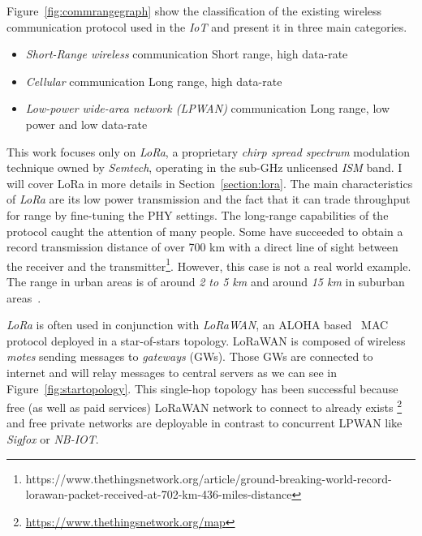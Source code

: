 Figure~\ref{fig:commrangegraph} show the classification
of the existing wireless communication protocol used in the \emph{IoT} and
present it in three main categories.

\begin{itemize}
    \item \emph{Short-Range wireless} communication Short range, high data-rate
    \item \emph{Cellular} communication Long range, high data-rate
    \item \emph{Low-power wide-area network (LPWAN)} communication Long range, low power and low data-rate
\end{itemize}



This work focuses only on \emph{LoRa}, a proprietary \emph{chirp spread spectrum}
modulation technique owned by \emph{Semtech}, operating in the sub-GHz
unlicensed \emph{ISM} band. I will cover LoRa in more details in 
Section~\ref{section:lora}.
The main characteristics of \emph{LoRa} are its low power transmission and the
fact that it can trade throughput for range by fine-tuning the PHY settings.
The long-range capabilities of the protocol caught the attention of
many people. 
Some have succeeded to obtain a record transmission distance of over 700 km with
a direct line of sight between the receiver and the
transmitter\footnote{https://www.thethingsnetwork.org/article/ground-breaking-world-record-lorawan-packet-received-at-702-km-436-miles-distance}.
However, this case is not a real world example. The range in urban areas is of
around \emph{2 to 5 km} and around \emph{15 km} in suburban
areas~\cite{8030482}.

\emph{LoRa} is often used in conjunction with \emph{LoRaWAN}, an ALOHA 
based~\cite{loraalliance:lorawanspecification} MAC protocol deployed in a star-of-stars 
topology.
LoRaWAN is composed of wireless \emph{motes} sending messages to \emph{gateways} (GWs).
Those GWs are connected to internet and will relay messages to central servers
as we can see in Figure~\ref{fig:startopology}.
This single-hop topology has been successful because free (as well as paid
services) LoRaWAN network to connect to already exists
\footnote{\url{https://www.thethingsnetwork.org/map}} and free private networks are
deployable in contrast to concurrent LPWAN like \emph{Sigfox} or \emph{NB-IOT}.

